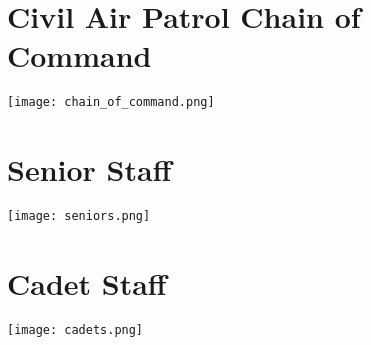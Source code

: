 \documentclass[12pt]{article}
\begin{document}
\section*{Civil Air Patrol Chain of Command}
\begin{center}
    \texttt{[image: chain\_of\_command.png]}
\end{center}

\pagebreak

\section*{Senior Staff}
\texttt{[image: seniors.png]}

\pagebreak

\section*{Cadet Staff}
\texttt{[image: cadets.png]}

\pagebreak
\end{document}
